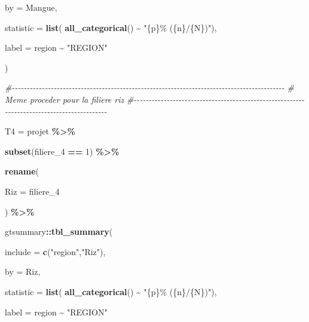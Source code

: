 \documentclass[
]{article}
\newenvironment{Shaded}{\begin{snugshade}}{\end{snugshade}}
\newcommand{\AttributeTok}[1]{\textcolor[rgb]{0.13,0.29,0.53}{#1}}
\newcommand{\CommentTok}[1]{\textcolor[rgb]{0.56,0.35,0.01}{\textit{#1}}}
\newcommand{\DecValTok}[1]{\textcolor[rgb]{0.00,0.00,0.81}{#1}}
\newcommand{\FunctionTok}[1]{\textcolor[rgb]{0.13,0.29,0.53}{\textbf{#1}}}
\newcommand{\NormalTok}[1]{#1}
\newcommand{\OtherTok}[1]{\textcolor[rgb]{0.56,0.35,0.01}{#1}}
\newcommand{\SpecialCharTok}[1]{\textcolor[rgb]{0.81,0.36,0.00}{\textbf{#1}}}
\newcommand{\StringTok}[1]{\textcolor[rgb]{0.31,0.60,0.02}{#1}}
\begin{document}
\begin{Shaded}
\begin{Highlighting}[]
  \AttributeTok{by =}\NormalTok{ Mangue,}
  
  \AttributeTok{statistic =} \FunctionTok{list}\NormalTok{( }\FunctionTok{all\_categorical}\NormalTok{() }\SpecialCharTok{\textasciitilde{}} \StringTok{"\{p\}\% (\{n\}/\{N\})"}\NormalTok{),}
  
  \AttributeTok{label =}\NormalTok{ region }\SpecialCharTok{\textasciitilde{}} \StringTok{"REGION"}
  
\NormalTok{)}





\CommentTok{\#{-}{-}{-}{-}{-}{-}{-}{-}{-}{-}{-}{-}{-}{-}{-}{-}{-}{-}{-}{-}{-}{-}{-}{-}{-}{-}{-}{-}{-}{-}{-}{-}{-}{-}{-}{-}{-}{-}{-}{-}{-}{-}{-}{-}{-}{-}{-}{-}{-}{-}{-}{-}{-}{-}{-}{-}{-}{-}{-}{-}{-}{-}{-}{-}{-}{-}{-}{-}{-}{-}{-}{-}{-}{-}{-}{-}{-}{-}{-}{-}{-}{-}{-}{-}{-}{-}{-}{-}{-}{-}{-}}
\CommentTok{\#     Meme proceder pour la filiere riz}
\CommentTok{\#{-}{-}{-}{-}{-}{-}{-}{-}{-}{-}{-}{-}{-}{-}{-}{-}{-}{-}{-}{-}{-}{-}{-}{-}{-}{-}{-}{-}{-}{-}{-}{-}{-}{-}{-}{-}{-}{-}{-}{-}{-}{-}{-}{-}{-}{-}{-}{-}{-}{-}{-}{-}{-}{-}{-}{-}{-}{-}{-}{-}{-}{-}{-}{-}{-}{-}{-}{-}{-}{-}{-}{-}{-}{-}{-}{-}{-}{-}{-}{-}{-}{-}{-}{-}{-}{-}{-}{-}{-}{-}{-}}





\NormalTok{T4 }\OtherTok{=}\NormalTok{ projet }\SpecialCharTok{\%\textgreater{}\%}
  
  \FunctionTok{subset}\NormalTok{(filiere\_4 }\SpecialCharTok{==} \DecValTok{1}\NormalTok{) }\SpecialCharTok{\%\textgreater{}\%} 
  
  \FunctionTok{rename}\NormalTok{(}
    
    \AttributeTok{Riz =}\NormalTok{ filiere\_4}
    
\NormalTok{  ) }\SpecialCharTok{\%\textgreater{}\%} 
  
\NormalTok{  gtsummary}\SpecialCharTok{::}\FunctionTok{tbl\_summary}\NormalTok{(}
    
    \AttributeTok{include =} \FunctionTok{c}\NormalTok{(}\StringTok{"region"}\NormalTok{,}\StringTok{"Riz"}\NormalTok{),}
    
    \AttributeTok{by =}\NormalTok{ Riz,}
    
    \AttributeTok{statistic =} \FunctionTok{list}\NormalTok{( }\FunctionTok{all\_categorical}\NormalTok{() }\SpecialCharTok{\textasciitilde{}} \StringTok{"\{p\}\% (\{n\}/\{N\})"}\NormalTok{),}
    
    \AttributeTok{label =}\NormalTok{ region }\SpecialCharTok{\textasciitilde{}} \StringTok{"REGION"}
    

\end{Highlighting}
\end{Shaded}
\end{document}
